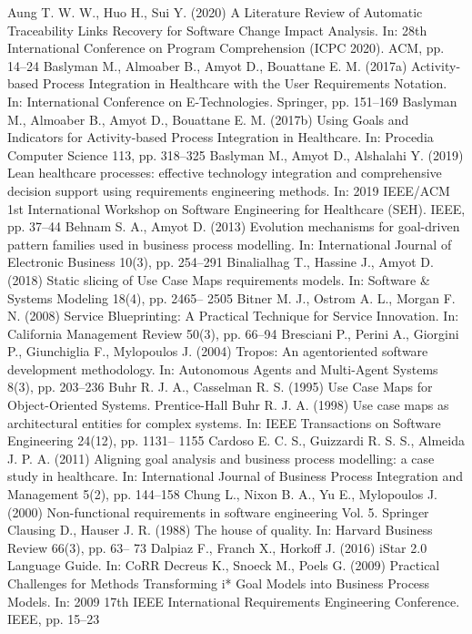 Aung T. W. W., Huo H., Sui Y. (2020) A Literature
Review of Automatic Traceability Links Recovery
for Software Change Impact Analysis. In: 28th
International Conference on Program Comprehension (ICPC 2020). ACM, pp. 14–24
Baslyman M., Almoaber B., Amyot D., Bouattane E. M. (2017a) Activity-based Process Integration in Healthcare with the User Requirements Notation. In: International Conference on
E-Technologies. Springer, pp. 151–169
Baslyman M., Almoaber B., Amyot D., Bouattane
E. M. (2017b) Using Goals and Indicators for
Activity-based Process Integration in Healthcare.
In: Procedia Computer Science 113, pp. 318–325
Baslyman M., Amyot D., Alshalahi Y. (2019)
Lean healthcare processes: effective technology
integration and comprehensive decision support
using requirements engineering methods. In: 2019
IEEE/ACM 1st International Workshop on Software Engineering for Healthcare (SEH). IEEE,
pp. 37–44
Behnam S. A., Amyot D. (2013) Evolution mechanisms for goal-driven pattern families used in
business process modelling. In: International Journal of Electronic Business 10(3), pp. 254–291
Binalialhag T., Hassine J., Amyot D. (2018) Static
slicing of Use Case Maps requirements models. In:
Software & Systems Modeling 18(4), pp. 2465–
2505
Bitner M. J., Ostrom A. L., Morgan F. N. (2008)
Service Blueprinting: A Practical Technique for
Service Innovation. In: California Management
Review 50(3), pp. 66–94
Bresciani P., Perini A., Giorgini P., Giunchiglia
F., Mylopoulos J. (2004) Tropos: An agentoriented software development methodology. In:
Autonomous Agents and Multi-Agent Systems
8(3), pp. 203–236
Buhr R. J. A., Casselman R. S. (1995) Use Case
Maps for Object-Oriented Systems. Prentice-Hall
Buhr R. J. A. (1998) Use case maps as architectural
entities for complex systems. In: IEEE Transactions on Software Engineering 24(12), pp. 1131–
1155
Cardoso E. C. S., Guizzardi R. S. S., Almeida
J. P. A. (2011) Aligning goal analysis and business
process modelling: a case study in healthcare. In:
International Journal of Business Process Integration and Management 5(2), pp. 144–158
Chung L., Nixon B. A., Yu E., Mylopoulos J.
(2000) Non-functional requirements in software
engineering Vol. 5. Springer
Clausing D., Hauser J. R. (1988) The house of quality. In: Harvard Business Review 66(3), pp. 63–
73
Dalpiaz F., Franch X., Horkoff J. (2016) iStar 2.0
Language Guide. In: CoRR
Decreus K., Snoeck M., Poels G. (2009) Practical
Challenges for Methods Transforming i* Goal
Models into Business Process Models. In: 2009
17th IEEE International Requirements Engineering Conference. IEEE, pp. 15–23

